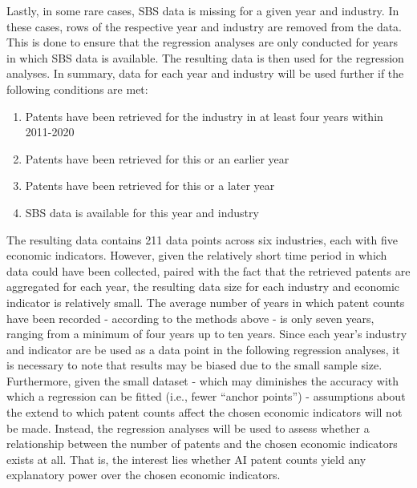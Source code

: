 \documentclass[
  12pt,
  a4paperpaper,
]{article}
\providecommand{\tightlist}{%
  \setlength{\itemsep}{0pt}\setlength{\parskip}{0pt}}\usepackage{longtable,booktabs,array}
\begin{document}
Lastly, in some rare cases, SBS data is missing for a given year and
industry. In these cases, rows of the respective year and industry are
removed from the data. This is done to ensure that the regression
analyses are only conducted for years in which SBS data is available.
The resulting data is then used for the regression analyses. In summary,
data for each year and industry will be used further if the following
conditions are met:

\begin{enumerate}
\def\labelenumi{\arabic{enumi}.}
\tightlist
\item
  Patents have been retrieved for the industry in at least four years
  within 2011-2020
\item
  Patents have been retrieved for this or an earlier year
\item
  Patents have been retrieved for this or a later year
\item
  SBS data is available for this year and industry
\end{enumerate}

The resulting data contains 211 data points across six industries, each
with five economic indicators. However, given the relatively short time
period in which data could have been collected, paired with the fact
that the retrieved patents are aggregated for each year, the resulting
data size for each industry and economic indicator is relatively small.
The average number of years in which patent counts have been recorded -
according to the methods above - is only seven years, ranging from a
minimum of four years up to ten years. Since each year's industry and
indicator are be used as a data point in the following regression
analyses, it is necessary to note that results may be biased due to the
small sample size. Furthermore, given the small dataset - which may
diminishes the accuracy with which a regression can be fitted (i.e.,
fewer ``anchor points'') - assumptions about the extend to which patent
counts affect the chosen economic indicators will not be made. Instead,
the regression analyses will be used to assess whether a relationship
between the number of patents and the chosen economic indicators exists
at all. That is, the interest lies whether AI patent counts yield any
explanatory power over the chosen economic indicators.
\end{document}
